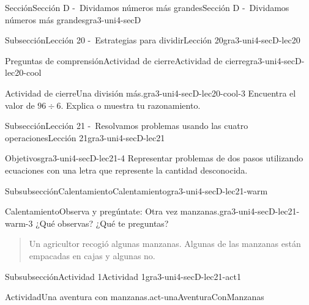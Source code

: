 \documentclass[twoside,10pt,]{article}
\begin{document}
\begin{sectionptx}{Sección}{Sección D -~Dividamos números más grandes}{}{Sección D -~Dividamos números más grandes}{}{}{gra3-uni4-secD}
\begin{subsectionptx}{Subsección}{Lección 20 -~Estrategias para dividir}{}{Lección 20}{}{}{gra3-uni4-secD-lec20}
\typeout{************************************************}
%
\begin{reading-questions-subsubsection}{Preguntas de comprensión}{Actividad de cierre}{}{Actividad de cierre}{}{}{gra3-uni4-secD-lec20-cool}
\begin{project}{Actividad de cierre}{Una división más.}{gra3-uni4-secD-lec20-cool-3}%
Encuentra el valor de \(96 \div 6\). Explica o muestra tu razonamiento.%
\end{project}%
\end{reading-questions-subsubsection}
\end{subsectionptx}
%
%
\typeout{************************************************}
\typeout{************************************************}
%
\begin{subsectionptx}{Subsección}{Lección 21 -~Resolvamos problemas usando las cuatro operaciones}{}{Lección 21}{}{}{gra3-uni4-secD-lec21}
\begin{objectives}{Objetivos}{gra3-uni4-secD-lec21-4}
Representar problemas de dos pasos utilizando ecuaciones con una letra que represente la cantidad desconocida.%
\end{objectives}
%
%
\typeout{************************************************}
\typeout{************************************************}
%
\begin{subsubsectionptx}{Subsubsección}{Calentamiento}{}{Calentamiento}{}{}{gra3-uni4-secD-lec21-warm}
\begin{exploration}{Calentamiento}{Observa y pregúntate: Otra vez manzanas.}{gra3-uni4-secD-lec21-warm-3}%
¿Qué observas? ¿Qué te preguntas?%
\par
\begin{quote}%
Un agricultor recogió algunas manzanas. Algunas de las manzanas están empacadas en cajas y algunas no.\end{quote}
%
\end{exploration}%
\end{subsubsectionptx}
%
%
\typeout{************************************************}
\typeout{************************************************}
%
\begin{subsubsectionptx}{Subsubsección}{Actividad 1}{}{Actividad 1}{}{}{gra3-uni4-secD-lec21-act1}
\begin{activity}{Actividad}{Una aventura con manzanas.}{act-unaAventuraConManzanas}%

\end{activity}
\end{subsubsectionptx}
\end{subsectionptx}
\end{sectionptx}
\end{document}
